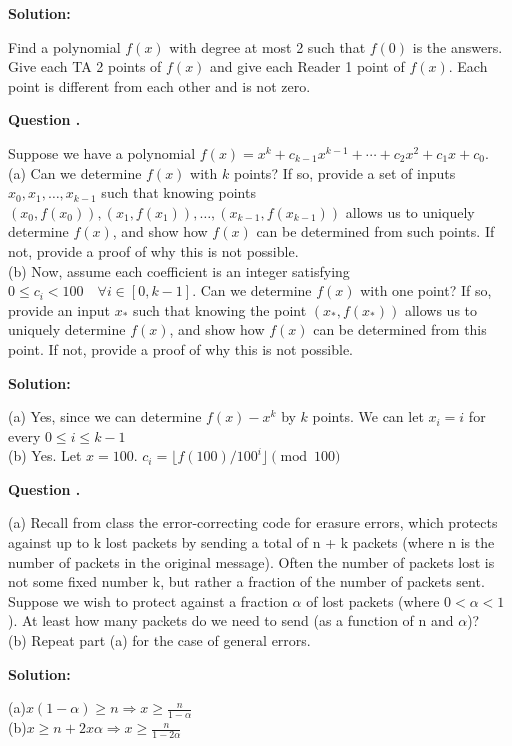 \documentclass[12pt]{article}
\newcounter{questionnumber}
\newenvironment{question}[1][]{\stepcounter{questionnumber}\par\noindent\textbf{Question \thequestionnumber. #1}\par}{\par}
\newenvironment{solution}{\par\noindent\textbf{Solution:}\par}{\par\vspace{1em}}
\begin{document}
\begin{solution}
    Find a polynomial $f(x)$ with degree at most 2 such that $f(0)$ is the answers.
    Give each TA 2 points of $f(x)$ and give each Reader 1 point of $f(x)$.
    Each point is different from each other and is not zero.
\end{solution}
\begin{question}
    Suppose we have a polynomial $f(x) = x^k + c_{k-1}x^{k-1} + \cdots + c_2x^2 + c_1x + c_0$.\\
    (a) Can we determine $f(x)$ with $k$ points? If so, provide a set of inputs $x_0, x_1, \ldots, x_{k-1}$ such that knowing points $(x_0, f(x_0)), (x_1, f(x_1)), \ldots, (x_{k-1}, f(x_{k-1}))$ allows us to uniquely determine $f(x)$, and show how $f(x)$ can be determined from such points. If not, provide a proof of why this is not possible.\\
    (b) Now, assume each coefficient is an integer satisfying $0 \leq c_i < 100 \quad \forall i \in [0, k-1]$. Can we determine $f(x)$ with one point? If so, provide an input $x_*$ such that knowing the point $(x_*, f(x_*))$ allows us to uniquely determine $f(x)$, and show how $f(x)$ can be determined from this point. If not, provide a proof of why this is not possible.
\end{question}
\begin{solution}
    \noindent
    (a) Yes, since we can determine $f(x)-x^k$ by $k$ points. We can let $x_i=i$ for every $0\leq i\leq k-1$\\
    (b) Yes. Let $x=100$. $c_i=\lfloor f(100)/100^i\rfloor\pmod{100}$
\end{solution}
\begin{question}
    \noindent
    (a) Recall from class the error-correcting code for erasure errors, which protects against up to k lost packets by sending a total of n + k packets (where n is the number of packets in the original message). Often the number of packets lost is not some fixed number k, but rather a fraction of the number of packets sent. Suppose we wish to protect against a fraction $\alpha$ of lost packets (where $0<\alpha<1$). At least how many packets do we need to send (as a function of n and $\alpha$)?\\
    (b) Repeat part (a) for the case of general errors.
\end{question}
\begin{solution}
    \noindent
    (a)$x\left( 1-\alpha \right) \ge n\Longrightarrow x\ge \frac{n}{1-\alpha}$\\
    (b)$x\ge n+2x\alpha \Longrightarrow x\ge \frac{n}{1-2\alpha}$
\end{solution}
\end{document}
